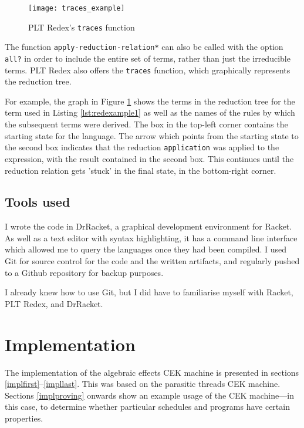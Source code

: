 \documentclass[12pt,a4paper,twoside,openright]{report}
\begin{document}
\begin{figure}
\centering
\caption{PLT Redex's \texttt{traces} function}
\label{fig:traces_example}
\texttt{[image: traces\_example]}
\end{figure}

The function \texttt{apply-reduction-relation*} can also be called with the option \texttt{all?} in order to include the entire set of terms, rather than just the irreducible terms. PLT Redex also offers the \texttt{traces} function, which graphically represents the reduction tree.

For example, the graph in Figure \ref{fig:traces_example} shows the terms in the reduction tree for the term used in Listing \ref{lst:redexample1} as well as the names of the rules by which the subsequent terms were derived. The box in the top-left corner contains the starting state for the language. The arrow which points from the starting state to the second box indicates that the reduction \texttt{application} was applied to the expression, with the result contained in the second box. This continues until the reduction relation gets 'stuck' in the final state, in the bottom-right corner.

\section{Tools used}

I wrote the code in DrRacket, a graphical development environment for Racket. As well as a text editor with syntax highlighting, it has a command line interface which allowed me to query the languages once they had been compiled. I used Git for source control for the code and the written artifacts, and regularly pushed to a Github repository for backup purposes.

I already knew how to use Git, but I did have to familiarise myself with Racket, PLT Redex, and DrRacket.

\chapter{Implementation}

The implementation of the algebraic effects CEK machine is presented in sections \ref{implfirst}--\ref{impllast}. This was based on the parasitic threads CEK machine. Sections \ref{implproving} onwards show an example usage of the CEK machine---in this case, to determine whether particular schedules and programs have certain properties.
\end{document}
